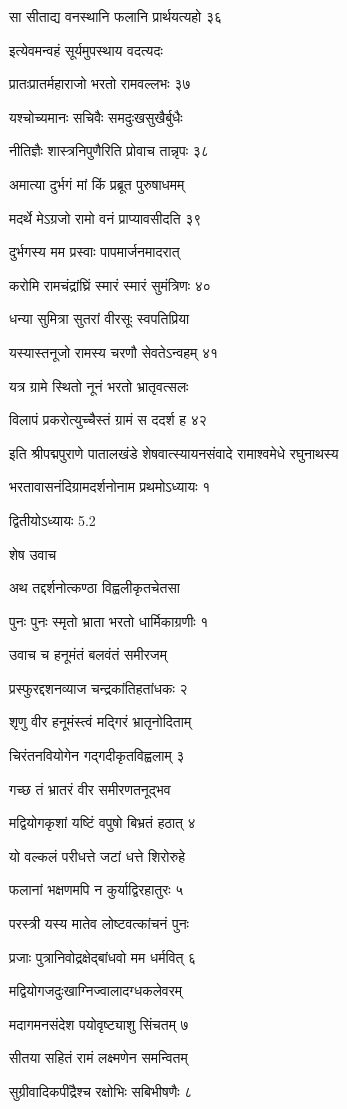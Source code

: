 सा सीताद्य वनस्थानि फलानि प्रार्थयत्यहो ३६

इत्येवमन्वहं सूर्यमुपस्थाय वदत्यदः

प्रातःप्रातर्महाराजो भरतो रामवल्लभः ३७

यश्चोच्यमानः सचिवैः समदुःखसुखैर्बुधैः

नीतिज्ञैः शास्त्रनिपुणैरिति प्रोवाच तान्नृपः ३८

अमात्या दुर्भगं मां किं प्रब्रूत पुरुषाधमम्

मदर्थे मेऽग्रजो रामो वनं प्राप्यावसीदति ३९

दुर्भगस्य मम प्रस्वाः पापमार्जनमादरात्

करोमि रामचंद्रांघ्रिं स्मारं स्मारं सुमंत्रिणः ४०

धन्या सुमित्रा सुतरां वीरसूः स्वपतिप्रिया

यस्यास्तनूजो रामस्य चरणौ सेवतेऽन्वहम् ४१

यत्र ग्रामे स्थितो नूनं भरतो भ्रातृवत्सलः

विलापं प्रकरोत्युच्चैस्तं ग्रामं स ददर्श ह ४२

इति श्रीपद्मपुराणे पातालखंडे शेषवात्स्यायनसंवादे रामाश्वमेधे रघुनाथस्य

भरतावासनंदिग्रामदर्शनोनाम प्रथमोऽध्यायः १

द्वितीयोऽध्यायः 5.2

शेष उवाच

अथ तद्दर्शनोत्कण्ठा विह्वलीकृतचेतसा

पुनः पुनः स्मृतो भ्राता भरतो धार्मिकाग्रणीः १

उवाच च हनूमंतं बलवंतं समीरजम्

प्रस्फुरद्दशनव्याज चन्द्रकांतिहतांधकः २

शृणु वीर हनूमंस्त्वं मद्गिरं भ्रातृनोदिताम्

चिरंतनवियोगेन गद्गदीकृतविह्वलाम् ३

गच्छ तं भ्रातरं वीर समीरणतनूद्भव

मद्वियोगकृशां यष्टिं वपुषो बिभ्रतं हठात् ४

यो वल्कलं परीधत्ते जटां धत्ते शिरोरुहे

फलानां भक्षणमपि न कुर्याद्विरहातुरः ५

परस्त्री यस्य मातेव लोष्टवत्कांचनं पुनः

प्रजाः पुत्रानिवोद्रक्षेद्बांधवो मम धर्मवित् ६

मद्वियोगजदुःखाग्निज्वालादग्धकलेवरम्

मदागमनसंदेश पयोवृष्ट्याशु सिंचतम् ७

सीतया सहितं रामं लक्ष्मणेन समन्वितम्

सुग्रीवादिकपींद्रैश्च रक्षोभिः सबिभीषणैः ८

